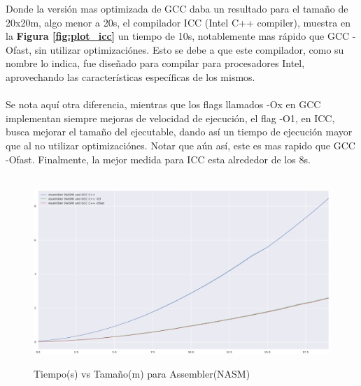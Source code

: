 Donde la versión mas optimizada de GCC daba un resultado para el tamaño de 20x20m, algo menor a 20s, el compilador ICC (Intel C++ compiler), muestra en la \textbf{Figura \ref{fig:plot_icc}} un tiempo de 10s, notablemente mas rápido que  GCC -Ofast, sin utilizar optimizaciónes. Esto se debe a que este compilador, como su nombre lo indica, fue diseñado para compilar para procesadores Intel, aprovechando las características específicas de los mismos. 
~\\
~\\
Se nota aquí otra diferencia, mientras que los flags llamados -Ox en GCC implementan siempre mejoras de velocidad de ejecución, el flag -O1, en ICC, busca mejorar el tamaño del ejecutable, dando así un tiempo de ejecución mayor que al no utilizar optimizaciónes. Notar que aún así, este es mas rapido que GCC -Ofast. Finalmente, la mejor medida para ICC esta alrededor de los 8s.
~\\
~\\
\begin{figure}[!htbp]
\caption{Tiempo(s) vs Tamaño(m) para Assembler(NASM)}
\includegraphics[width=\textwidth]{imagenes/plot_asm.png}
\label{fig:plot_asm}
\end{figure}

